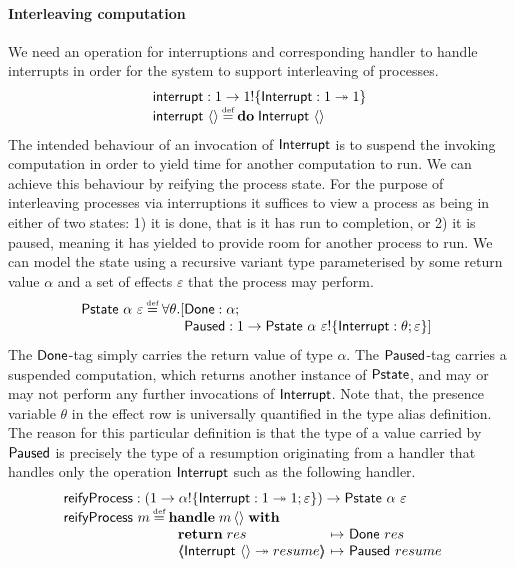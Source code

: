 \documentclass[12pt,phd,lfcs,twoside,openright,logo,leftchapter,normalheadings]{infthesis}
\theoremstyle{plain}
\theoremstyle{definition}
\begin{document}
\paragraph{Interleaving computation}
%
We need an operation for interruptions and corresponding handler to
handle interrupts in order for the system to support interleaving of
processes.
%
\[
  \bl
    \interrupt : \UnitType \to \UnitType \eff \{\Interrupt : \UnitType \opto \UnitType\}\\
    \interrupt~\Unit \defas \Do\;\Interrupt~\Unit
  \el
\]
%
The intended behaviour of an invocation of $\mathsf{Interrupt}$ is to suspend
the invoking computation in order to yield time for another
computation to run.
%
We can achieve this behaviour by reifying the process state. For the
purpose of interleaving processes via interruptions it suffices to
view a process as being in either of two states: 1) it is done, that
is it has run to completion, or 2) it is paused, meaning it has
yielded to provide room for another process to run.
%
We can model the state using a recursive variant type parameterised by
some return value $\alpha$ and a set of effects $\varepsilon$ that the
process may perform.
%
\[
  \Pstate~\alpha~\varepsilon \defas \forall \theta.
     \ba[t]{@{}l@{}l}
       [&\Done:\alpha;\\
        &\Suspended:\UnitType \to \Pstate~\alpha~\varepsilon \eff \{\Interrupt:\theta;\varepsilon\} ]
     \ea
\]
%
%
The $\mathsf{Done}$-tag simply carries the return value of type $\alpha$. The
$\mathsf{Paused}$-tag carries a suspended computation, which returns
another instance of $\mathsf{Pstate}$, and may or may not perform any further
invocations of $\mathsf{Interrupt}$. Note that, the presence variable $\theta$
in the effect row is universally quantified in the type alias
definition. The reason for this particular definition is that the type
of a value carried by $\mathsf{Paused}$ is precisely the type of a
resumption originating from a handler that handles only the operation
$\mathsf{Interrupt}$ such as the following handler.
%
\[
  \bl
    \reifyP : (\UnitType \to \alpha \eff \{\Interrupt: \UnitType \opto \UnitType;\varepsilon\}) \to \Pstate~\alpha~\varepsilon\\
    \reifyP~m \defas
         \ba[t]{@{}l}
           \Handle\;m\,\Unit\;\With\\
             ~\ba{@{~}l@{~}c@{~}l}
                \Return\;res &\mapsto& \Done~res\\
                \OpCase{\Interrupt}{\Unit}{resume} &\mapsto& \Suspended~resume
              \ea
         \ea
  \el
\]
\end{document}
